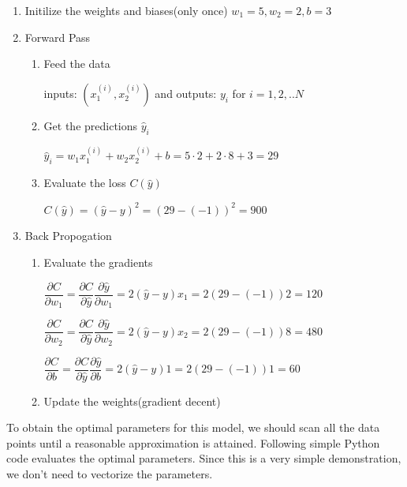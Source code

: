 \documentclass[12pt]{article}
\begin{document}
\begin{enumerate}
\item Initilize the weights and biases(only once)
$w_1=5,w_2=2,b=3$
\item Forward Pass
\begin{enumerate}
\item Feed the data

inputs: $\left(x_1^{(i)},x_2^{(i)}\right)$ and outputs: $y_i$ for $i=1,2,..N$
\item Get the predictions $\hat{y}_i$

$\hat{y}_i=w_{1}x_{1}^{(i)}+w_{2}x_{2}^{(i)}+b = 5\cdot2+2\cdot8+3=29$
\item Evaluate the loss $C(\hat{y})$

$C(\hat{y})=(\hat{y}-y)^2 = (29-(-1))^2=900$
\end{enumerate}
\item Back Propogation
\begin{enumerate}
\item Evaluate the gradients

$\dfrac{\partial C}{\partial w_{1}} = \dfrac{\partial C}{\partial \hat{y}} \dfrac{\partial \hat{y}}{\partial w_1}=2(\hat{y}-y)x_1 = 2(29-(-1))2=120 $ 

$\dfrac{\partial C}{\partial w_{2}} = \dfrac{\partial C}{\partial \hat{y}} \dfrac{\partial \hat{y}}{\partial w_2}=2(\hat{y}-y)x_2 = 2(29-(-1))8=480 $

$\dfrac{\partial C}{\partial b} = \dfrac{\partial C}{\partial \hat{y}} \dfrac{\partial \hat{y}}{\partial b}=2(\hat{y}-y)1 = 2(29-(-1))1=60 $
\item Update the weights(gradient decent)
\end{enumerate}
\end{enumerate}

To obtain the optimal parameters for this model, we should scan all the data points until a reasonable approximation is attained. Following simple Python code evaluates the optimal parameters. Since this is a very simple demonstration, we don't need to vectorize the parameters. 
\end{document}
